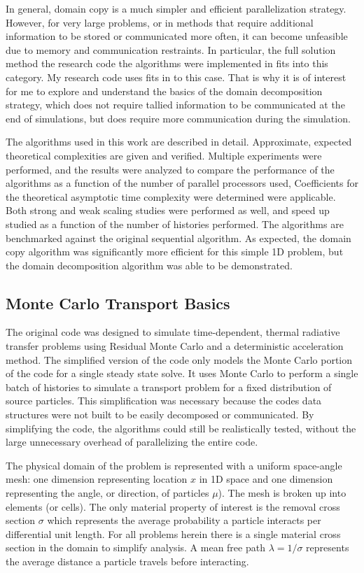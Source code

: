 \documentclass[12pt]{article}
\begin{document}
In general, domain copy is a much simpler and efficient parallelization strategy.  However, for
very large problems, or in methods that require additional information to be stored
or communicated more often, it can become unfeasible due to memory and communication
restraints.  In particular, the full solution method the research code the algorithms
were implemented in fits into this category. My research code uses fits in to
this case. That is why it is of interest for me to explore and understand the basics
of the domain decomposition strategy, which does not require tallied information to
be communicated at the end of simulations, but does require more communication during
the simulation.


The algorithms used in this work are described in detail.  Approximate, expected theoretical
complexities are given and verified.
Multiple experiments
were performed, and the results were analyzed to compare the performance of the
algorithms as a function of the number of parallel processors used,  Coefficients for the theoretical asymptotic time complexity were
determined were applicable. Both strong and weak scaling studies were performed as well, and speed up
studied as a function of the number of histories performed. The algorithms are benchmarked
against the original sequential algorithm. As expected, the domain copy algorithm was
significantly more efficient for this simple 1D problem, but the domain decomposition
algorithm was able to be demonstrated.

\subsection{Monte Carlo Transport Basics}

The original code was designed to simulate time-dependent, thermal radiative transfer
problems using Residual Monte Carlo and a deterministic acceleration method.  
The simplified version of the code only models the Monte Carlo portion of the code for
a single steady state solve.  It uses Monte Carlo to perform a single batch of
histories to simulate a transport problem for a fixed distribution of source particles.  This simplification was necessary because the
codes data structures were not built to be easily decomposed or communicated.  By
simplifying the code, the algorithms could still be realistically tested, without the
large unnecessary overhead of parallelizing the entire code.

The physical domain of the problem is represented with a uniform space-angle mesh: one
dimension representing location $x$ in 1D space and one dimension representing the
angle, or direction, of particles $\mu$).  The mesh is broken up into elements (or cells).
The only material property of interest is the removal cross section $\sigma$ which
represents the average probability a particle interacts per differential unit length. For
all problems herein there is a single material cross section in the domain to
simplify analysis. A mean free path $\lambda = 1/\sigma$ represents the average
distance a particle travels before interacting.
\end{document}
